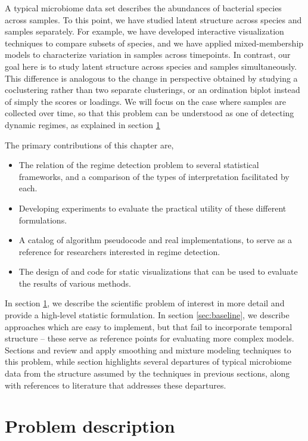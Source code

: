 \documentclass{article}
\begin{document}
A typical microbiome data set describes the abundances of bacterial species
across samples. To this point, we have studied latent structure across species
and samples separately. For example, we have developed interactive visualization
techniques to compare subsets of species, and we have applied mixed-membership
models to characterize variation in samples across timepoints. In contrast, our
goal here is to study latent structure across species and samples
simultaneously. This difference is analogous to the change in perspective
obtained by studying a coclustering rather than two separate clusterings, or an
ordination biplot instead of simply the scores or loadings. We will focus on the
case where samples are collected over time, so that this problem can be
understood as one of detecting dynamic regimes, as explained in section
\ref{sec:problem_description}

The primary contributions of this chapter are,
\begin{itemize}
\item The relation of the regime detection problem to several statistical
  frameworks, and a comparison of the types of interpretation facilitated by
  each.
\item Developing experiments to evaluate the practical utility of these
  different formulations.
\item A catalog of algorithm pseudocode and real implementations, to serve as a
  reference for researchers interested in regime detection.
\item The design of and code for static visualizations that can be used to
  evaluate the results of various methods.
\end{itemize}

In section \ref{sec:problem_description}, we describe the scientific problem of
interest in more detail and provide a high-level statistic formulation. In
section \ref{sec:baseline}, we describe approaches which are easy to implement,
but that fail to incorporate temporal structure -- these serve as reference
points for evaluating more complex models.
Sections \label{sec:temporal_probabilistic_models}
and \label{sec:temporal_mixture_models} review and apply smoothing and mixture
modeling techniques to this problem, while
section \label{sec:alternative_probabilistic_models} highlights several
departures of typical microbiome data from the structure assumed by the
techniques in previous sections, along with references to literature that
addresses these departures.

\section{Problem description}
\label{sec:problem_description}
\end{document}
